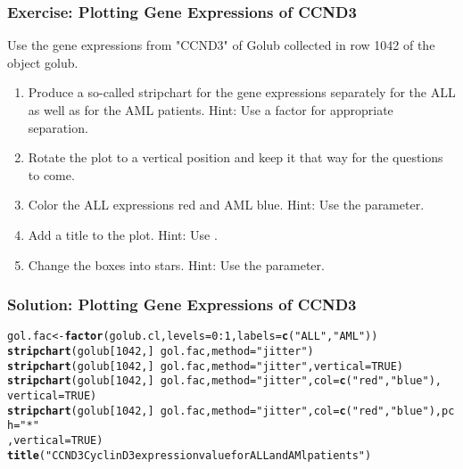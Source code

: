 \documentclass{article}\usepackage[]{graphicx}\usepackage[usenames,dvipsnames]{color}
\makeatletter
\newcommand{\hlnum}[1]{\textcolor[rgb]{0.686,0.059,0.569}{#1}}%
\newcommand{\hlstr}[1]{\textcolor[rgb]{0.192,0.494,0.8}{#1}}%
\newcommand{\hlopt}[1]{\textcolor[rgb]{0,0,0}{#1}}%
\newcommand{\hlstd}[1]{\textcolor[rgb]{0.345,0.345,0.345}{#1}}%
\newcommand{\hlkwb}[1]{\textcolor[rgb]{0.69,0.353,0.396}{#1}}%
\newcommand{\hlkwc}[1]{\textcolor[rgb]{0.333,0.667,0.333}{#1}}%
\newcommand{\hlkwd}[1]{\textcolor[rgb]{0.737,0.353,0.396}{\textbf{#1}}}%
\newenvironment{kframe}{%
 \def\at@end@of@kframe{}%
 \ifinner\ifhmode%
  \def\at@end@of@kframe{\end{minipage}}%
  \begin{minipage}{\columnwidth}%
 \fi\fi%
 \def\FrameCommand##1{\hskip\@totalleftmargin \hskip-\fboxsep
 \colorbox{shadecolor}{##1}\hskip-\fboxsep
     \hskip-\linewidth \hskip-\@totalleftmargin \hskip\columnwidth}%
 \MakeFramed {\advance\hsize-\width
   \@totalleftmargin\z@ \linewidth\hsize
   \@setminipage}}%
 {\par\unskip\endMakeFramed%
 \at@end@of@kframe}
\newenvironment{knitrout}{}{} %
\makeatother
\begin{document}
\subsubsection*{Exercise: Plotting Gene Expressions of CCND3}
Use the gene expressions from "CCND3" of Golub collected in row
1042 of the object golub.
\begin{enumerate}[label=(\emph{\alph*})]

\item  Produce a so-called stripchart for the gene expressions separately
for the ALL as well as for the AML patients. Hint: Use a factor
for appropriate separation.
\item  Rotate the plot to a vertical position and keep it that way for the
questions to come.
\item  Color the ALL expressions red and AML blue. Hint: Use the 
parameter.
\item  Add a title to the plot. Hint: Use .
\item   Change the boxes into stars. Hint: Use the  parameter.
\end{enumerate}

\subsubsection*{Solution: Plotting Gene Expressions of CCND3}
\begin{knitrout}
\color{fgcolor}\begin{kframe}
\begin{alltt}
\hlstd{gol.fac} \hlkwb{<-} \hlkwd{factor}\hlstd{(golub.cl,}\hlkwc{levels}\hlstd{=}\hlnum{0}\hlopt{:}\hlnum{1}\hlstd{,} \hlkwc{labels}\hlstd{=} \hlkwd{c}\hlstd{(}\hlstr{"ALL"}\hlstd{,}\hlstr{"AML"}\hlstd{))}
\hlkwd{stripchart}\hlstd{(golub[}\hlnum{1042}\hlstd{,]} \hlopt{~} \hlstd{gol.fac,}\hlkwc{method}\hlstd{=}\hlstr{"jitter"}\hlstd{)}
\hlkwd{stripchart}\hlstd{(golub[}\hlnum{1042}\hlstd{,]} \hlopt{~} \hlstd{gol.fac,}\hlkwc{method}\hlstd{=}\hlstr{"jitter"}\hlstd{,}\hlkwc{vertical} \hlstd{=} \hlnum{TRUE}\hlstd{)}
\hlkwd{stripchart}\hlstd{(golub[}\hlnum{1042}\hlstd{,]} \hlopt{~} \hlstd{gol.fac,}\hlkwc{method}\hlstd{=}\hlstr{"jitter"}\hlstd{,}\hlkwc{col}\hlstd{=}\hlkwd{c}\hlstd{(}\hlstr{"red"}\hlstd{,} \hlstr{"blue"}\hlstd{),}
\hlkwc{vertical} \hlstd{=} \hlnum{TRUE}\hlstd{)}
\hlkwd{stripchart}\hlstd{(golub[}\hlnum{1042}\hlstd{,]} \hlopt{~} \hlstd{gol.fac,}\hlkwc{method}\hlstd{=}\hlstr{"jitter"}\hlstd{,}\hlkwc{col}\hlstd{=}\hlkwd{c}\hlstd{(}\hlstr{"red"}\hlstd{,} \hlstr{"blue"}\hlstd{),} \hlkwc{pch}\hlstd{=}\hlstr{"*"}
\hlstd{,}\hlkwc{vertical} \hlstd{=} \hlnum{TRUE}\hlstd{)}
\hlkwd{title}\hlstd{(}\hlstr{"CCND3 Cyclin D3 expression value for ALL and AMl patients"}\hlstd{)}
\end{alltt}
\end{kframe}
\end{knitrout}
\end{document}
